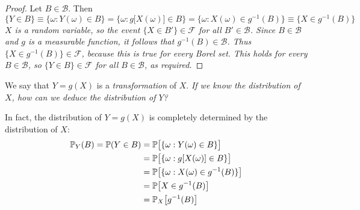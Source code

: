 \begin{proof}
Let $B\in\mathcal{B}$. Then
\[
\{Y\in B\} 
	\equiv \{\omega: Y(\omega)\in B\}
	= \{\omega: g\big[X(\omega)\big] \in B\}
	= \{\omega:X(\omega)\in g^{-1}(B)\}
	\equiv \{X\in g^{-1}(B)\}
\]
\bit
\it $X$ is a random variable, so the event $\{X\in B'\}\in\mathcal{F}$ for all $B'\in\mathcal{B}$.
\it Since $B\in\mathcal{B}$ and $g$ is a measurable function, it follows that $g^{-1}(B)\in\mathcal{B}$.
\it Thus $\{X\in g^{-1}(B)\}\in\mathcal{F}$, because this is true for \emph{every} Borel set.
\eit
This holds for every $B\in\mathcal{B}$, so $\{Y\in B\}\in\mathcal{F}$ for all $B\in\mathcal{B}$, as required.

%
\end{proof}

\bigskip
We say that $Y=g(X)$ is a \emph{transformation} of $X$. 
\bit
\it If we know the distribution of $X$, how can we deduce the distribution of $Y$?
\eit

In fact, the distribution of $Y=g(X)$ is completely determined by the distribution of $X$:
\begin{align*}
\mathbb{P}_Y(B) 
	= \mathbb{P}(Y\in B) 
	& = \mathbb{P}\big[\{\omega: Y(\omega)\in B\}\big] \\
	& = \mathbb{P}\big[\{\omega: g[X(\omega)]\in B\}\big] \\
	& = \mathbb{P}\big[\{\omega: X(\omega)\in g^{-1}(B)\}\big] \\
	& = \mathbb{P}\big[X\in g^{-1}(B)\big] \\
	& = \mathbb{P}_X\big[g^{-1}(B)\big]
\end{align*}

